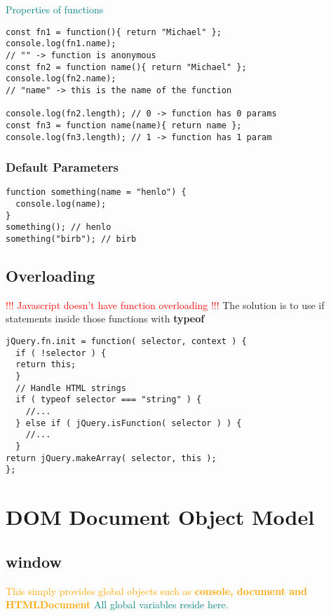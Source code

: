 \documentclass[main.tex,fontsize=6pt,paper=a4,paper=landscape,DIV=calc,]{scrartcl}
\begin{document}
\begin{multicols*}{4}
  \textcolor{teal}{Properties of functions}
\vspace{-2mm}
\begin{lstlisting}
const fn1 = function(){ return "Michael" };
console.log(fn1.name);
// "" -> function is anonymous
const fn2 = function name(){ return "Michael" };
console.log(fn2.name);
// "name" -> this is the name of the function

console.log(fn2.length); // 0 -> function has 0 params
const fn3 = function name(name){ return name };
console.log(fn3.length); // 1 -> function has 1 param
\end{lstlisting}
\vspace{2mm}

\subsubsection{Default Parameters}
\vspace{-2mm}
\begin{lstlisting}
function something(name = "henlo") {
  console.log(name);
}
something(); // henlo
something("birb"); // birb
\end{lstlisting}
\vspace{2mm}

\subsection{Overloading}
 \textcolor{red}{!!! Javascript doesn't have function overloading !!!}\newline
 The solution is to use if statements inside those functions with \textbf{typeof}
\vspace{-2mm}
\begin{lstlisting}
jQuery.fn.init = function( selector, context ) {
  if ( !selector ) {
  return this;
  }
  // Handle HTML strings
  if ( typeof selector === "string" ) {
    //...
  } else if ( jQuery.isFunction( selector ) ) {
    //...
  }
return jQuery.makeArray( selector, this );
};
\end{lstlisting}
\vspace{2mm}

\section{DOM Document Object Model}

\subsection{window}  
\textcolor{orange}{This simply provides global objects such as \textbf{console, document and HTMLDocument}}\newline
\textcolor{teal}{All global variables reside here.}


\end{multicols*}
\end{document}
